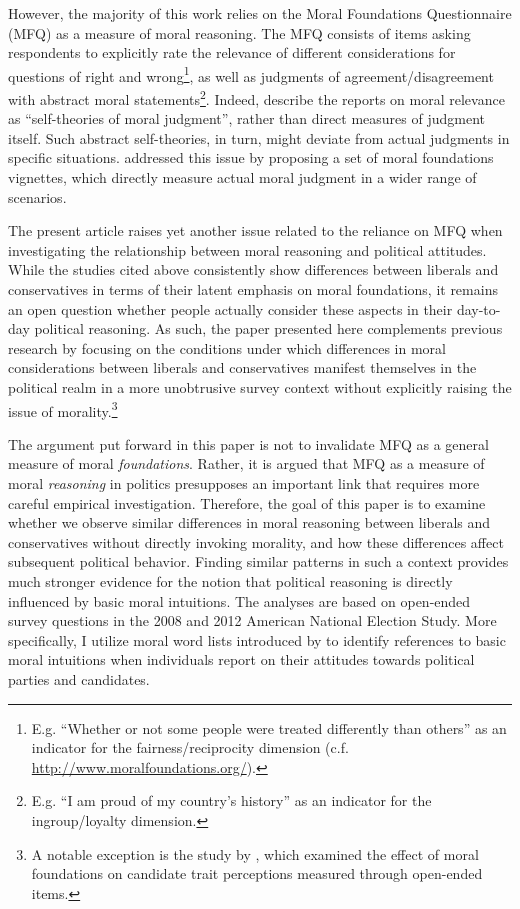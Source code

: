 \documentclass[12pt]{article}
\begin{document}
However, the majority of this work relies on the Moral Foundations Questionnaire (MFQ) as a measure of moral reasoning. The MFQ consists of items asking respondents to explicitly rate the relevance of different considerations for questions of right and wrong\footnote{E.g. ``Whether or not some people were treated differently than others'' as an indicator for the fairness/reciprocity dimension (c.f. \url{http://www.moralfoundations.org/}).}, as well as judgments of agreement/disagreement with abstract moral statements\footnote{E.g. ``I am proud of my country’s history'' as an indicator for the ingroup/loyalty dimension.}. Indeed, \citet[1031]{graham2009liberals} describe the reports on moral relevance as ``self-theories of moral judgment'', rather than direct measures of judgment itself. Such abstract self-theories, in turn, might deviate from actual judgments in specific situations. \citet{clifford2015moral} addressed this issue by proposing a set of moral foundations vignettes, which directly measure actual moral judgment in a wider range of scenarios.

The present article raises yet another issue related to the reliance on MFQ when investigating the relationship between moral reasoning and political attitudes. While the studies cited above consistently show differences between liberals and conservatives in terms of their latent emphasis on moral foundations, it remains an open question whether people actually consider these aspects in their day-to-day political reasoning. As such, the paper presented here complements previous research by focusing on the conditions under which differences in moral considerations between liberals and conservatives manifest themselves in the political realm in a more unobtrusive survey context without explicitly raising the issue of morality.\footnote{A notable exception is the study by \citet{clifford2014linking}, which examined the effect of moral foundations on candidate trait perceptions measured through open-ended items.}

The argument put forward in this paper is not to invalidate MFQ as a general measure of moral \textit{foundations}. Rather, it is argued that MFQ as a measure of moral \textit{reasoning} in politics presupposes an important link that requires more careful empirical investigation. Therefore, the goal of this paper is to examine whether we observe similar differences in moral reasoning between liberals and conservatives without directly invoking morality, and how these differences affect subsequent political behavior. Finding similar patterns in such a context provides much stronger evidence for the notion that political reasoning is directly influenced by basic moral intuitions. The analyses are based on open-ended survey questions in the 2008 and 2012 American National Election Study. More specifically, I utilize moral word lists introduced by \citet{graham2009liberals} to identify references to basic moral intuitions when individuals report on their attitudes towards political parties and candidates.
\end{document}
